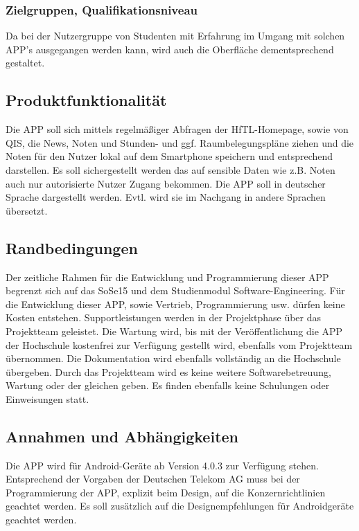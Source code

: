 \subsubsection{Zielgruppen, Qualifikationsniveau}

Da bei der Nutzergruppe von Studenten mit Erfahrung im Umgang mit solchen APP's ausgegangen werden kann, wird auch die Oberfläche dementsprechend gestaltet.

\subsection{\textbf{Produktfunktionalität}}

Die APP soll sich mittels regelmäßiger Abfragen der \acs{HfTL}-Homepage, sowie von \acs{QIS}, die News, Noten und Stunden- und ggf. Raumbelegungspläne ziehen und die Noten für den Nutzer lokal auf dem Smartphone speichern und entsprechend darstellen. 
Es soll sichergestellt werden das auf sensible Daten wie z.B. Noten auch nur autorisierte Nutzer Zugang bekommen. Die APP soll in deutscher Sprache dargestellt werden. Evtl. wird sie im Nachgang in andere Sprachen übersetzt. 

\subsection{\textbf{Randbedingungen}}

Der zeitliche Rahmen für die Entwicklung und Programmierung dieser APP begrenzt sich auf das \ac{SoSe15} und dem Studienmodul Software-Engineering.
Für die Entwicklung dieser APP, sowie Vertrieb, Programmierung usw. dürfen keine Kosten entstehen.
Supportleistungen werden in der Projektphase über das Projektteam geleistet. Die Wartung wird, bis mit der Veröffentlichung die APP der Hochschule kostenfrei zur Verfügung gestellt wird, ebenfalls vom Projektteam übernommen. Die Dokumentation wird ebenfalls vollständig an die Hochschule übergeben.
Durch das Projektteam wird es keine weitere Softwarebetreuung, Wartung oder der gleichen geben. Es finden ebenfalls keine Schulungen oder Einweisungen statt.

\subsection{\textbf{Annahmen und Abhängigkeiten}}

Die APP wird für Android-Geräte ab Version 4.0.3 zur Verfügung stehen.
Entsprechend der Vorgaben der Deutschen Telekom AG muss bei der Programmierung der APP, explizit beim Design, auf die Konzernrichtlinien geachtet werden. Es soll zusätzlich auf die Designempfehlungen für Androidgeräte geachtet werden.

